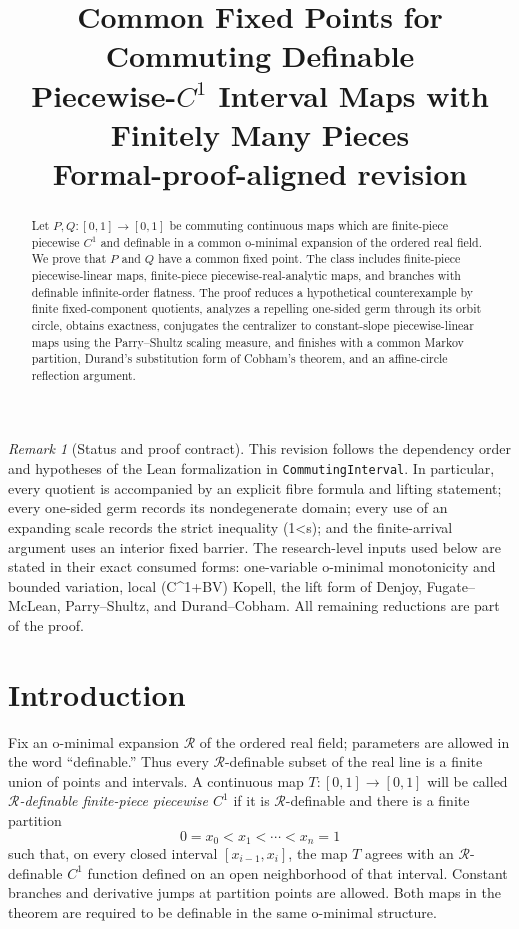 \documentclass[11pt]{article}
\title{Common Fixed Points for Commuting Definable\\
Piecewise-\(C^1\) Interval Maps with Finitely Many Pieces\\
\large Formal-proof-aligned revision}
\author{}
\date{}
\theoremstyle{definition}
\theoremstyle{remark}
\newtheorem{remark}[theorem]{Remark}
\newcommand{\I}{[0,1]}
\begin{document}
\maketitle

\begin{abstract}
Let $P,Q:[0,1]\to[0,1]$ be commuting continuous maps which are
finite-piece piecewise $C^1$ and definable in a common o-minimal expansion of
the ordered real field.  We prove that $P$ and $Q$ have a common fixed point.
The class includes finite-piece piecewise-linear maps, finite-piece
piecewise-real-analytic maps, and branches with definable infinite-order
flatness.  The proof reduces a hypothetical counterexample by finite
fixed-component quotients, analyzes a repelling one-sided germ through its
orbit circle, obtains exactness, conjugates the centralizer to constant-slope
piecewise-linear maps using the Parry--Shultz scaling measure, and finishes
with a common Markov partition, Durand's substitution form of Cobham's
theorem, and an affine-circle reflection argument.
\end{abstract}

\begin{remark}[Status and proof contract]
This revision follows the dependency order and hypotheses of the Lean
formalization in \texttt{CommutingInterval}.  In particular, every quotient
is accompanied by an explicit fibre formula and lifting statement; every
one-sided germ records its nondegenerate domain; every use of an expanding
scale records the strict inequality (1<s); and the finite-arrival argument
uses an interior fixed barrier.  The research-level inputs used below are
stated in their exact consumed forms: one-variable o-minimal monotonicity and
bounded variation, local (C^{1+BV}) Kopell, the lift form of Denjoy,
Fugate--McLean, Parry--Shultz, and Durand--Cobham.  All remaining reductions
are part of the proof.
\end{remark}

\section*{Introduction}
Fix an o-minimal expansion $\mathcal R$ of the ordered real field; parameters
are allowed in the word ``definable.''  Thus every $\mathcal R$-definable
subset of the real line is a finite union of points and intervals.  A
continuous map $T\colon\I\to\I$ will be called
\emph{$\mathcal R$-definable finite-piece piecewise $C^1$} if it is
$\mathcal R$-definable and there is a finite partition
\[
 0=x_0<x_1<\cdots <x_n=1
\]
such that, on every closed interval $[x_{i-1},x_i]$, the map $T$ agrees
with an $\mathcal R$-definable $C^1$ function defined on an open
neighborhood of that interval.  Constant branches and derivative jumps at
partition points are allowed.  Both maps in the theorem are required to be
definable in the same o-minimal structure.
\end{document}
